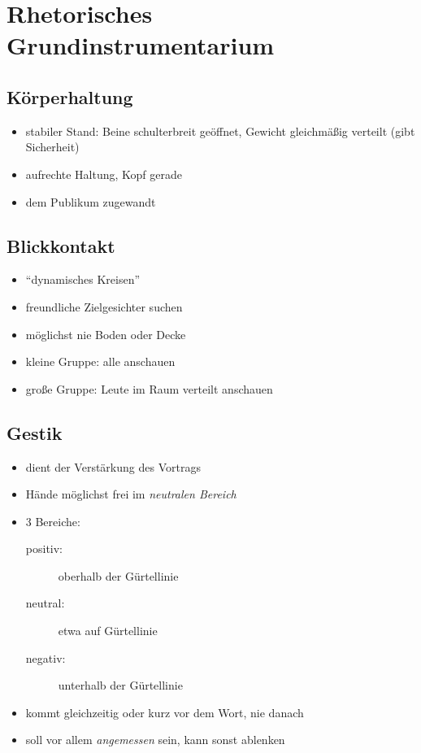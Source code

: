 \section{Rhetorisches Grundinstrumentarium}
\label{rhetorik-grundstrinumentarium}

\subsection{Körperhaltung}
\begin{itemize}
\item stabiler Stand: Beine schulterbreit geöffnet, Gewicht gleichmäßig verteilt (gibt Sicherheit)
\item aufrechte Haltung, Kopf gerade
\item dem Publikum zugewandt
\end{itemize}

\subsection{Blickkontakt}
\begin{itemize}
\item "`dynamisches Kreisen"'
\item freundliche Zielgesichter suchen
\item möglichst nie Boden oder Decke
\item kleine Gruppe: alle anschauen
\item große Gruppe: Leute im Raum verteilt anschauen
\end{itemize}

\subsection{Gestik}
\begin{itemize}
\item dient der Verstärkung des Vortrags
\item Hände möglichst frei im \emph{neutralen Bereich}
\item 3 Bereiche:
  \begin{description}
    \item [positiv:] oberhalb der Gürtellinie
    \item [neutral:] etwa auf Gürtellinie
    \item [negativ:] unterhalb der Gürtellinie
  \end{description}
\item kommt gleichzeitig oder kurz vor dem Wort, nie danach
\item soll vor allem \emph{angemessen} sein, kann sonst ablenken
\end{itemize}

